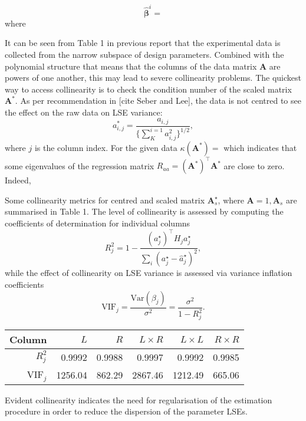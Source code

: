 \documentclass[a4paper,11pt,twoside]{article}
\theoremstyle{mytheoremstyle}
\begin{document}
\begin{equation}
\hat{\mathbf{\beta}}^i = 
\end{equation}
where 
\par It can be seen from Table 1 in previous report that the experimental data is collected from the narrow subspace of design parameters. Combined with the polynomial structure that means that the columns of the data matrix $\mathbf{A} $ are powers of one another, this may lead to severe collinearity problems. The quickest way to access collinearity is to check the condition number of the scaled matrix $\mathbf{A}^\ast$. As per recommendation in [cite Seber and Lee], the data is not centred to see the effect on the raw data on LSE variance:
\begin{equation*}
a^{\ast}_{i,j} = \frac{a_{i,j}}{\Big\{ \sum_{K}^{i=1} a^{2}_{i,j}\Big\}^{1/2}}, 
\end{equation*}
where $j$ is the column index.
For the given data $\kappa(\mathbf{A}^\ast) = $ which indicates that some eigenvalues of the regression matrix $R_{aa} = (\mathbf{A}^\ast)^{\top}\mathbf{A}^\ast$ are close to zero. Indeed, 

Some collinearity metrics for centred and scaled matrix $\mathbf{A}_{s}^{\star}$, where $\mathbf{A} = 1, \mathbf{A}_{s}$ are summarised in Table 1. The level of collinearity is assessed by computing the coefficients of determination for individual columns
\begin{equation*}
R^{2}_{j} = 1 - \frac{(a^{\star}_{j})^{\top} H_j a^{\star}_{j}}{\sum_{i}( a^{\star}_{j} - \hat{a}^{\star}_{j})^2},
\end{equation*} 
while the effect of collinearity on LSE variance is assessed via variance inflation coefficients
\begin{equation*}
\text{VIF}_j = \frac{\text{Var}(\beta_j)}{\sigma^2} = \frac{\sigma^2}{1 - R^{2}_{j}}.
\end{equation*}
\begin{table}[h]
	\centering
	\begin{tabular}{rrrrrr}
		Column & $L$ & $R$ & $L \times R$ & $L \times L$ & $R \times R$ \\
		\hline
		$R^{2}_{j}$ & 0.9992  &  0.9988  &  0.9997  &  0.9992  &  0.9985 \\
		VIF$_j$ & 1256.04 & 862.29 & 2867.46 & 1212.49 & 665.06 \\
		\hline
	\end{tabular}
\end{table}
Evident collinearity indicates the need for regularisation of the estimation procedure in order to reduce the dispersion of the parameter LSEs.
\end{document}
